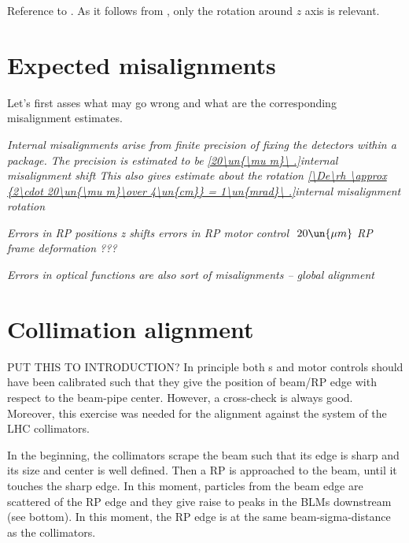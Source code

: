 Reference to .
As it follows from , only the rotation around $z$ axis is relevant.

\section[al exp misal]{Expected misalignments}

Let's first asses what may go wrong and what are the corresponding misalignment estimates.

\noindent\em{Internal misalignments} arise from finite precision of fixing the detectors within a package. The precision is estimated to be
\eqref{20\un{\mu m}\ .}{internal misalignment shift}
This also gives estimate about the rotation
\eqref{\De\rh \approx {2\cdot 20\un{\mu m}\over 4\un{cm}} = 1\un{mrad}\ .}{internal misalignment rotation}

\noindent\em{Errors in RP positions}
\> z shifts
\> errors in RP motor control $~20\un{\mu m}$
\> RP frame deformation ???

\noindent\em{Errors in optical functions} are also sort of misalignments -- global alignment


\section[al collim]{Collimation alignment}

PUT THIS TO INTRODUCTION? In principle both s and  motor controls should have been calibrated such that they give the position of beam/RP edge with respect to the beam-pipe center. However, a cross-check is always good. Moreover, this exercise was needed for the alignment against the system of the LHC collimators.

In the beginning, the collimators scrape the beam such that its edge is sharp and its size and center is well defined. Then a RP is approached to the beam, until it touches the sharp edge. In this moment, particles from the beam edge are scattered of the RP edge and they give raise to peaks in the BLMs downstream (see  bottom). In this moment, the RP edge is at the same beam-sigma-distance as the collimators.

